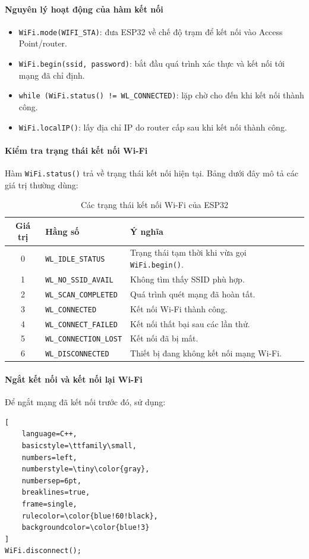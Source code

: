 \paragraph{Nguyên lý hoạt động của hàm kết nối}
\begin{itemize}
	\item \texttt{WiFi.mode(WIFI\_STA)}: đưa ESP32 về chế độ trạm để kết nối vào Access Point/router.
	\item \texttt{WiFi.begin(ssid, password)}: bắt đầu quá trình xác thực và kết nối tới mạng đã chỉ định.
	\item \texttt{while (WiFi.status() != WL\_CONNECTED)}: lặp chờ cho đến khi kết nối thành công.
	\item \texttt{WiFi.localIP()}: lấy địa chỉ IP do router cấp sau khi kết nối thành công.
\end{itemize}

\paragraph{Kiểm tra trạng thái kết nối Wi-Fi}
Hàm \texttt{WiFi.status()} trả về trạng thái kết nối hiện tại. Bảng dưới đây mô tả các giá trị thường dùng:

\begin{table}[H]
	\centering
	\caption{Các trạng thái kết nối Wi-Fi của ESP32}
	\label{tab:wifi_status_codes}
	\begin{tabular}{|c|l|p{7.5cm}|}
		\hline
		\textbf{Giá trị} & \textbf{Hằng số} & \textbf{Ý nghĩa} \\
		\hline
		0 & \texttt{WL\_IDLE\_STATUS} & Trạng thái tạm thời khi vừa gọi \texttt{WiFi.begin()}. \\
		\hline
		1 & \texttt{WL\_NO\_SSID\_AVAIL} & Không tìm thấy SSID phù hợp. \\
		\hline
		2 & \texttt{WL\_SCAN\_COMPLETED} & Quá trình quét mạng đã hoàn tất. \\
		\hline
		3 & \texttt{WL\_CONNECTED} & Kết nối Wi-Fi thành công. \\
		\hline
		4 & \texttt{WL\_CONNECT\_FAILED} & Kết nối thất bại sau các lần thử. \\
		\hline
		5 & \texttt{WL\_CONNECTION\_LOST} & Kết nối đã bị mất. \\
		\hline
		6 & \texttt{WL\_DISCONNECTED} & Thiết bị đang không kết nối mạng Wi-Fi. \\
		\hline
	\end{tabular}
\end{table}

\paragraph{Ngắt kết nối và kết nối lại Wi-Fi}
Để ngắt mạng đã kết nối trước đó, sử dụng:
\begin{lstlisting}[
	language=C++,
	basicstyle=\ttfamily\small,
	numbers=left,
	numberstyle=\tiny\color{gray},
	numbersep=6pt,
	breaklines=true,
	frame=single,
	rulecolor=\color{blue!60!black},
	backgroundcolor=\color{blue!3}
]
WiFi.disconnect();
\end{lstlisting}

